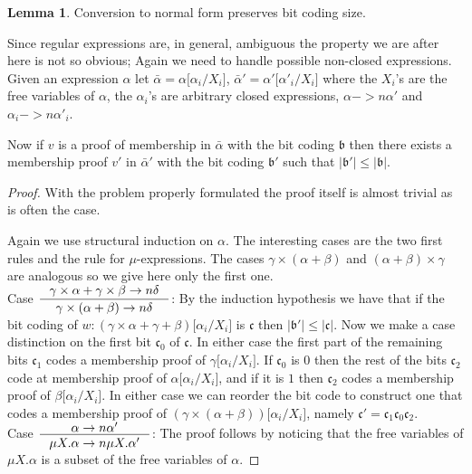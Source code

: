 \documentclass[a4paper, oneside]{memoir}
\theoremstyle{definition}
\newtheorem{lemma}{Lemma}
\begin{document}
\begin{lemma}
  Conversion to normal form preserves bit coding size.

  Since regular expressions are, in general, ambiguous the property we are after
  here is not so obvious; Again we need to handle possible non-closed
  expressions. Given an expression $\alpha$ let $\bar{\alpha} = \alpha \lbrack
  \alpha_i / X_i \rbrack$, $\bar{\alpha}' = \alpha' \lbrack \alpha'_i / X_i
  \rbrack$ where the $X_i$'s are the free variables of $\alpha$, the
  $\alpha_i$'s are arbitrary closed expressions, $\alpha ->n \alpha'$ and
  $\alpha_i ->n \alpha'_i$.

  Now if $v$ is a proof of membership in $\bar{\alpha}$ with the bit coding
  $\mathfrak{b}$ then there exists a membership proof $v'$ in $\bar{\alpha}'$
  with the bit coding $\mathfrak{b'}$ such that $| \mathfrak{b'} | \leq |
  \mathfrak{b} |$.

  \begin{proof}
    With the problem properly formulated the proof itself is almost trivial as
    is often the case.

    Again we use structural induction on $\alpha$. The interesting cases are the
    two first rules and the rule for $\mu$-expressions. The cases $\gamma \times
    (\alpha + \beta)$ and $(\alpha + \beta) \times \gamma$ are analogous so we
    give here only the first one.\\[1em]

    Case $\inference{\gamma \times \alpha + \gamma \times \beta ->n
      \delta}{\gamma \times (\alpha + \beta) ->n \delta}$: By the induction
    hypothesis we have that if the bit coding of $w : (\gamma \times \alpha +
    \gamma + \beta)\lbrack \alpha_i / X_i \rbrack$ is $\mathfrak{c}$ then $|
    \mathfrak{b'} | \leq | \mathfrak{c} |$. Now we make a case distinction on
    the first bit $\mathfrak{c_0}$ of $\mathfrak{c}$. In either case the first
    part of the remaining bits $\mathfrak{c_1}$ codes a membership proof of
    $\gamma\lbrack \alpha_i / X_i \rbrack$. If $\mathfrak{c_0}$ is $0$ then the
    rest of the bits $\mathfrak{c_2}$ code at membership proof of $\alpha\lbrack
    \alpha_i / X_i \rbrack$, and if it is $1$ then $\mathfrak{c_2}$ codes a
    membership proof of $\beta\lbrack \alpha_i / X_i \rbrack$. In either case we
    can reorder the bit code to construct one that codes a membership proof of
    $(\gamma \times (\alpha + \beta))\lbrack \alpha_i / X_i \rbrack$, namely
    $\mathfrak{c'} = \mathfrak{c_1}\mathfrak{c_0}\mathfrak{c_2}$.\\[1em]

    Case $\inference{\alpha ->n \alpha'}{\mu X. \alpha ->n \mu X. \alpha'}$: The
    proof follows by noticing that the free variables of $\mu X. \alpha$ is a
    subset of the free variables of $\alpha$.
  \end{proof}
\end{lemma}
\end{document}
